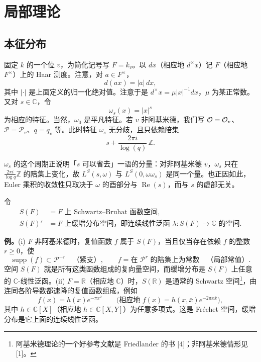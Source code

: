 \section{局部理论}

\subsection*{本征分布}

固定 $k$ 的一个位 $v$，为简化记号写 $F=k_v$。以 $dx$（相应地 $d^\times x$）记 $F$（相应地 $F^\times$）上的 Haar 测度。注意，对 $a\in F^\times$，
\[
d(ax)=|a|\,dx,
\]
其中 $|\cdot|$ 是上面定义的归一化绝对值。注意于是 $d^\times x=\mu|x|^{-1}dx$，$\mu$ 为某正常数。又对 $s\in\mathbb C$，令
\[
\omega_s(x)=|x|^s
\]
为相应的特征。当然，$\omega_0$ 是平凡特征。若 $v$ 非阿基米德，我们写 $\mathcal{O}=\mathcal{O}_v$、$\mathcal P=\mathcal P_v$、$q=q_v$ 等。此时特征 $\omega_s$ 无分歧，且只依赖陪集
\[
s+\frac{2\pi i}{\log(q)}\,\mathbb Z.
\]

\begin{annote}
$\omega_s$ 的这个周期正说明「$s$ 可以省去」一语的分量：对非阿基米德 $v$，$\omega_s$ 只在 $\frac{2\pi i}{\log q}\mathbb Z$ 的陪集上变化，故 $L^S(s,\omega)$ 与 $L^S(0,\omega\omega_s)$ 是同一个量。也正因如此，Euler 乘积的收敛性只取决于 $\omega$ 的酉部分与 $\operatorname{Re}(s)$，而与 $s$ 的虚部无关。
\par\vspace{0.15em}{\raggedleft 【来源：Tate 论文 §2；Bump《Automorphic Forms and Representations》3.1（A）】\par}
\end{annote}

令
\[
\begin{aligned}
S(F)&=\text{$F$ 上 Schwartz--Bruhat 函数空间},\\
S(F)'&=\text{$F$ 上缓增分布空间，即连续线性泛函 }\lambda:S(F)\to\mathbb C\text{ 的空间}.
\end{aligned}
\]

\medskip\noindent\textbf{例。}\quad (i) $F$ 非阿基米德时，复值函数 $f$ 属于 $S(F)$，当且仅当存在依赖 $f$ 的整数 $r\ge0$，使
\[
\operatorname{supp}(f)\subset\mathcal P^{-r}\quad\text{（紧支）},\qquad
f=\text{在 }\mathcal P^r\text{ 的陪集上为常数}\quad\text{（局部常值）}.
\]
空间 $S(F)$ 就是所有这类函数组成的复向量空间，而缓增分布是 $S(F)$ 上任意的 $\mathbb C$-线性泛函。(ii) $F=\mathbb R$（相应地 $\mathbb C$）时，$S(\mathbb R)$ 是通常的 Schwartz 空间\footnote{阿基米德理论的一个好参考文献是 Friedlander 的书 [4]；非阿基米德情形见 [1]。}，由连同各阶导数都速降的复值函数组成，例如
\[
f(x)=h(x)e^{-\pi x^2}\qquad\bigl(\text{相应地 }f(x)=h(x,\bar x)e^{-2\pi x\bar x}\bigr),
\]
其中 $h\in\mathbb C[X]$（相应地 $h\in\mathbb C[X,Y]$）为任意多项式。这是 Fr\'echet 空间，缓增分布是它上面的连续线性泛函。

